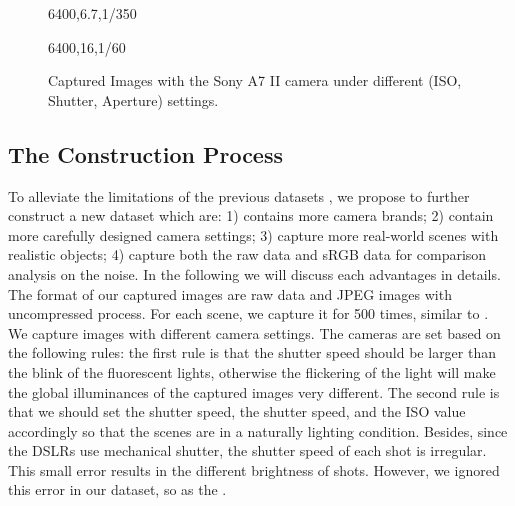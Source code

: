 \begin{figure}
{\begin{minipage}[t]{0.32\textwidth}
{\footnotesize 6400,6.7,1/350}
\end{minipage}
\begin{minipage}[t]{0.32\textwidth}
\centering
{}
{\footnotesize 6400,16,1/60}
\end{minipage}
}
    \caption{Captured Images with the Sony A7 II camera under different (ISO, Shutter, Aperture) settings.}
    \label{fig6-1}
\end{figure}


\subsection{The Construction Process}

To alleviate the limitations of the previous datasets \cite{RENOIR2014,crosschannel2016,dnd2017}, we propose to further construct a new dataset which are: 1) contains more camera brands; 2) contain more carefully designed camera settings; 3) capture more real-world scenes with realistic objects; 4) capture both the raw data and sRGB data for comparison analysis on the noise. In the following we will discuss each advantages in details. The format of our captured images are raw data and JPEG images with uncompressed process. For each scene, we capture it for 500 times, similar to \cite{crosschannel2016}. We capture images with different camera settings. The cameras are set based on the following rules: the first rule is that the shutter speed should be larger than the blink of the fluorescent lights, otherwise the flickering of the light will make the global illuminances of the captured images very different. The second rule is that we should set the shutter speed, the shutter speed, and the ISO value accordingly so that the scenes are in a naturally lighting condition. Besides, since the DSLRs use mechanical shutter, the shutter speed of each shot is irregular. This small error results in the different brightness of shots. However, we ignored this error in our dataset, so as the \cite{crosschannel2016}.

